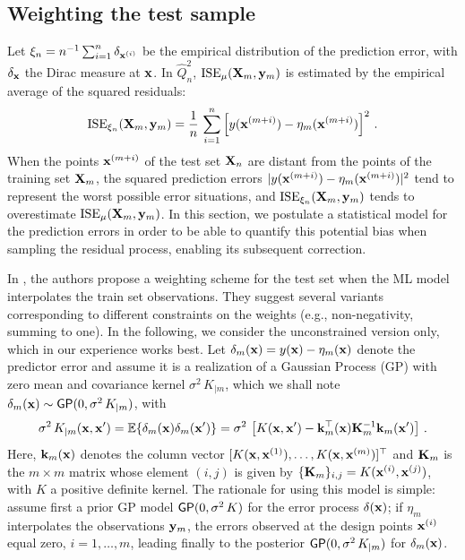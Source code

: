 \subsection{Weighting the test sample}\label{S:weighting}

Let $\xi_n = n^{-1} \sum_{i=1}^n \delta_{{\bf x}^{(i)}}$ be the empirical distribution of the prediction error, with $\delta_{{\bf x}}$ the Dirac measure at ${\bf x}$. 
In $\widehat Q^2_n$, $\mathrm{ISE}_\mu({\bf X}_m,{\bf y}_m)$ is estimated by the empirical average of the squared residuals:
$$
\mathrm{ISE}_{\xi_n}({\bf X}_m,{\bf y}_m) = \frac1n\, \sum_{i=1}^n  \left[ y({\bf x}^{(m+i)})-\eta_m({\bf x}^{(m+i)})\right]^2 \,.
$$
When the points ${\bf x}^{(m+i)}$ of the test set ${\bf X}_n$ are distant from the points of the training set ${\bf X}_m$, the squared prediction errors $|y({\bf x}^{(m+i)})-\eta_m({\bf x}^{(m+i)})|^2$ tend to represent the worst possible error situations, and $\mathrm{ISE}_{\xi_n}({\bf X}_m,{\bf y}_m)$ tends to overestimate $\mathrm{ISE}_\mu({\bf X}_m,{\bf y}_m)$. 
In this section, we postulate a statistical model for the prediction errors in order to be able to quantify this potential bias when sampling the residual process, enabling its subsequent correction. 

In \cite{PR2021a}, the authors propose a weighting scheme for the test set when the ML model interpolates the train set observations. 
They suggest several variants corresponding to different constraints on the weights (e.g., non-negativity, summing to one). 
In the following, we consider the unconstrained version only, which in our experience works best. 
Let $\delta_m({\bf x})=y({\bf x})-\eta_m({\bf x})$ denote the predictor error and assume it is  a realization of a Gaussian Process (GP) 
with zero mean and covariance kernel $\sigma^2\,K_{|m}$, 
which we shall note $\delta_m({\bf x}) \sim \mathsf{GP}(0,\sigma^2\,K_{|m})$, with
$$
\sigma^2\, K_{|m}({\bf x},{\bf x}')=\mathbb{E}\{\delta_m({\bf x})\delta_m({\bf x}')\}=\sigma^2\,\left[K({\bf x},{\bf x}')-\mathbf{k}_m^\top({\bf x})\mathbf{K}_m^{-1}\mathbf{k}_m({\bf x}')\right]\,.
$$
Here, $\mathbf{k}_m({\bf x})$ denotes the column vector $[K({\bf x},{\bf x}^{(1)}),\ldots,K({\bf x},{\bf x}^{(m)})]^\top$ and $\mathbf{K}_m$ is the $m\times m$ matrix whose element $(i,j)$ is given by $\{\mathbf{K}_m\}_{i,j}=K({\bf x}^{(i)},{\bf x}^{(j)})$, with $K$ a positive definite kernel. 
The rationale for using this model is simple: assume first a prior GP model $\mathsf{GP}(0,\sigma^2\,K)$ for the error process $\delta({\bf x})$; if $\eta_m$ interpolates the observations ${\bf y}_m$, the errors observed at the design points ${\bf x}^{(i)}$ equal zero, $i=1,\ldots,m$, leading finally to the posterior $\mathsf{GP}(0,\sigma^2\,K_{|m})$ for $\delta_m({\bf x})$. 

